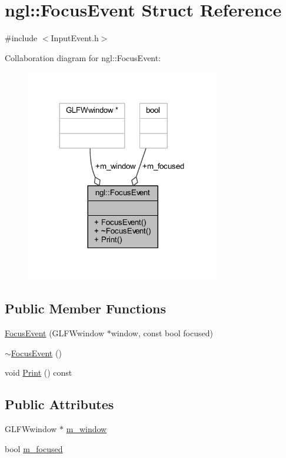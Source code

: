 \hypertarget{structngl_1_1_focus_event}{}\section{ngl\+:\+:Focus\+Event Struct Reference}
\label{structngl_1_1_focus_event}


{\ttfamily \#include $<$Input\+Event.\+h$>$}



Collaboration diagram for ngl\+:\+:Focus\+Event\+:
\nopagebreak
\begin{figure}[H]
\begin{center}
\leavevmode
\includegraphics[width=240pt]{structngl_1_1_focus_event__coll__graph}
\end{center}
\end{figure}
\subsection*{Public Member Functions}
\begin{DoxyCompactItemize}
\item 
\mbox{\hyperlink{structngl_1_1_focus_event_a58d617d0e4daf05ad3cdfcebcacc9dd2}{Focus\+Event}} (G\+L\+F\+Wwindow $\ast$window, const bool focused)
\item 
\mbox{\hyperlink{structngl_1_1_focus_event_a790ab4f30a2842da928ec47eddce3def}{$\sim$\+Focus\+Event}} ()
\item 
void \mbox{\hyperlink{structngl_1_1_focus_event_ac04d96491d5498db4235618c7f4ffe80}{Print}} () const
\end{DoxyCompactItemize}
\subsection*{Public Attributes}
\begin{DoxyCompactItemize}
\item 
G\+L\+F\+Wwindow $\ast$ \mbox{\hyperlink{structngl_1_1_focus_event_af35e9d9e95feaef37a7f214bab4c2fb8}{m\+\_\+window}}
\item 
bool \mbox{\hyperlink{structngl_1_1_focus_event_adf1661904c5d4163ebcf668173173670}{m\+\_\+focused}}
\end{DoxyCompactItemize}


